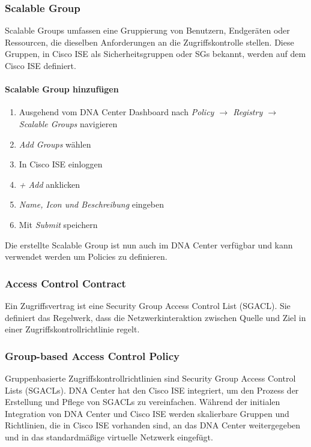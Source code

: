 \subsubsection{Scalable Group}
Scalable Groups umfassen eine Gruppierung von Benutzern, Endgeräten oder Ressourcen, die dieselben Anforderungen an die Zugriffskontrolle stellen. Diese Gruppen, in Cisco ISE als Sicherheitsgruppen oder SGs bekannt, werden auf dem Cisco ISE definiert. 

\paragraph{Scalable Group hinzufügen}
\begin{enumerate}
	\item Ausgehend vom DNA Center Dashboard nach \textit{Policy $\rightarrow$ Registry $\rightarrow$ Scalable Groups} navigieren
	\item \textit{Add Groups} wählen
	\item In Cisco ISE einloggen
	\item \textit{+ Add} anklicken
	\item \textit{Name, Icon und Beschreibung} eingeben 
	\item Mit \textit{Submit} speichern
\end{enumerate}
Die erstellte Scalable Group ist nun auch im DNA Center verfügbar und kann verwendet werden um Policies zu definieren.

\subsubsection{Access Control Contract}
Ein Zugriffsvertrag ist eine Security Group Access Control List (SGACL). Sie definiert das Regelwerk, dass die Netzwerkinteraktion zwischen Quelle und Ziel in einer Zugriffskontrollrichtlinie regelt.

\subsubsection{Group-based Access Control Policy}
Gruppenbasierte Zugriffskontrollrichtlinien sind Security Group Access Control Lists (SGACLs). DNA Center hat den Cisco ISE integriert, um den Prozess der Erstellung und Pflege von SGACLs zu vereinfachen. Während der initialen Integration von DNA Center und Cisco ISE werden skalierbare Gruppen und Richtlinien, die in Cisco ISE vorhanden sind, an das DNA Center weitergegeben und in das standardmäßige virtuelle Netzwerk eingefügt.

